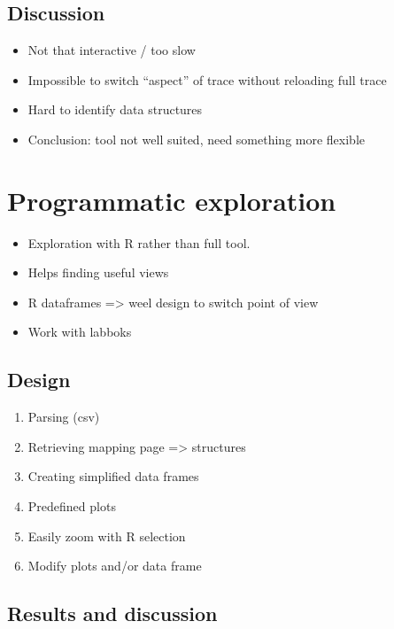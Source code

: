 \subsection{Discussion}

\begin{itemize}
    \item  Not that interactive / too slow
    \item  Impossible to switch “aspect” of trace without reloading full trace
    \item  Hard to identify data structures
    \item  Conclusion: tool not well suited, need something more flexible
\end{itemize}

\section{Programmatic exploration}
\label{sec:visu-second}

\begin{itemize}
    \item Exploration with R rather than full tool.
    \item Helps finding useful views
    \item R dataframes => weel design to switch point of view
    \item Work with labboks 
\end{itemize}

\subsection{Design}

\begin{enumerate}
    \item Parsing (csv)
    \item Retrieving mapping page => structures
    \item Creating simplified data frames
    \item Predefined plots
    \item Easily zoom  with R selection
    \item Modify plots and/or data frame
\end{enumerate}

\subsection{Results and discussion}

